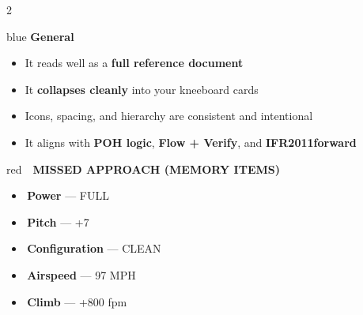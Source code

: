 \documentclass[10pt]{article}
\newcommand{\checkbox}{\raisebox{0.0ex}{\fbox{\rule{0pt}{1.25ex}\rule{1.25ex}{0pt}}}\,}
\begin{document}
\begin{multicols}{2}
\raggedright

\begin{sectbox}{blue}
  {\small\textbf{General}}
\end{sectbox}
\vspace{1mm}
\begin{itemize}[left=0pt,label={},labelsep=2mm]
  \item {\scriptsize It reads well as a \textbf{full reference document}}
  \item {\scriptsize It \textbf{collapses cleanly} into your kneeboard cards}
  \item {\scriptsize Icons, spacing, and hierarchy are consistent and intentional}
  \item {\scriptsize It aligns with \textbf{POH logic}, \textbf{Flow + Verify}, and \textbf{IFR\x2011forward}}
\end{itemize}

\vspace{2mm}
\begin{sectbox}{red}
  {\small\textbf{🚨 MISSED APPROACH (MEMORY ITEMS)}}
\end{sectbox}
\vspace{1mm}
\begin{itemize}[left=0pt,label={},labelsep=2mm]
  \item \checkbox {\scriptsize \textbf{Power} --- FULL}
  \item \checkbox {\scriptsize \textbf{Pitch} --- +7\degree}
  \item \checkbox {\scriptsize \textbf{Configuration} --- CLEAN}
  \item \checkbox {\scriptsize \textbf{Airspeed} --- 97 MPH}
  \item \checkbox {\scriptsize \textbf{Climb} --- +800 fpm}
\end{itemize}

\columnbreak


\end{multicols}
\end{document}
